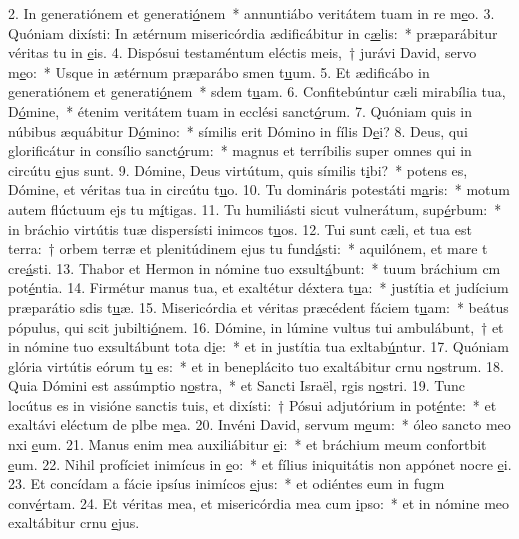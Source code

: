 2. In generatiónem et generati\uline{ó}nem~* annuntiábo veritátem tuam in re m\uline{e}o.
3. Quóniam dixísti: In ætérnum misericórdia ædificábitur in c\uline{æ}lis:~* præparábitur véritas tu in \uline{e}is.
4. Dispósui testaméntum eléctis meis,~† jurávi David, servo m\uline{e}o:~* Usque in ætérnum præparábo smen t\uline{u}um.
5. Et ædificábo in generatiónem et generati\uline{ó}nem~* sdem t\uline{u}am.
6. Confitebúntur cæli mirabília tua, D\uline{ó}mine,~* étenim veritátem tuam in ecclési sanct\uline{ó}rum.
7. Quóniam quis in núbibus æquábitur D\uline{ó}mino:~* símilis erit Dómino in fílis D\uline{e}i?
8. Deus, qui glorificátur in consílio sanct\uline{ó}rum:~* magnus et terríbilis super omnes qui in circútu \uline{e}jus sunt.
9. Dómine, Deus virtútum, quis símilis t\uline{i}bi?~* potens es, Dómine, et véritas tua in circútu t\uline{u}o.
10. Tu domináris potestáti m\uline{a}ris:~* motum autem flúctuum ejs tu m\uline{í}tigas.
11. Tu humiliásti sicut vulnerátum, sup\uline{é}rbum:~* in bráchio virtútis tuæ dispersísti inimcos t\uline{u}os.
12. Tui sunt cæli, et tua est terra:~† orbem terræ et plenitúdinem ejus tu fund\uline{á}sti:~* aquilónem, et mare t cre\uline{á}sti.
13. Thabor et Hermon in nómine tuo exsult\uline{á}bunt:~* tuum bráchium cm pot\uline{é}ntia.
14. Firmétur manus tua, et exaltétur déxtera t\uline{u}a:~* justítia et judícium præparátio sdis t\uline{u}æ.
15. Misericórdia et véritas præcédent fáciem t\uline{u}am:~* beátus pópulus, qui scit jubilti\uline{ó}nem.
16. Dómine, in lúmine vultus tui ambulábunt,~† et in nómine tuo exsultábunt tota d\uline{i}e:~* et in justítia tua exltab\uline{ú}ntur.
17. Quóniam glória virtútis eórum t\uline{u} es:~* et in beneplácito tuo exaltábitur crnu n\uline{o}strum.
18. Quia Dómini est assúmptio n\uline{o}stra,~* et Sancti Israël, rgis n\uline{o}stri.
19. Tunc locútus es in visióne sanctis tuis, et dixísti:~† Pósui adjutórium in pot\uline{é}nte:~* et exaltávi eléctum de plbe m\uline{e}a.
20. Invéni David, servum m\uline{e}um:~* óleo sancto meo nxi \uline{e}um.
21. Manus enim mea auxiliábitur \uline{e}i:~* et bráchium meum confortbit \uline{e}um.
22. Nihil profíciet inimícus in \uline{e}o:~* et fílius iniquitátis non appónet nocre \uline{e}i.
23. Et concídam a fácie ipsíus inimícos \uline{e}jus:~* et odiéntes eum in fugm conv\uline{é}rtam.
24. Et véritas mea, et misericórdia mea cum \uline{i}pso:~* et in nómine meo exaltábitur crnu \uline{e}jus.
